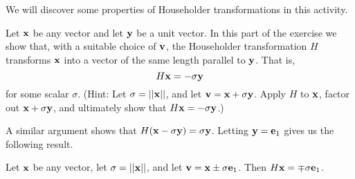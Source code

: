 \begin{pactivity} We will discover some properties of Householder transformations in this activity.
\ba
\item Let $\mathbf{x}$ be any vector and let $\mathbf{y}$ be a unit vector. In this part of the exercise we show that, with a suitable choice of $\mathbf{v}$, the Householder transformation $H$ transforms $\mathbf{x}$ into a vector of the same length parallel to $\mathbf{y}$. That is, 
\[H \mathbf{x} = -\sigma \mathbf{y}\]
for some scalar $\sigma$. (Hint: Let $\sigma = ||\mathbf{x}||$, and let $\mathbf{v} = \mathbf{x} + \sigma \mathbf{y}$. Apply $H$ to $\mathbf{x}$, factor out $\mathbf{x} + \sigma \mathbf{y}$, and ultimately show that $H \mathbf{x} = -\sigma \mathbf{y}$.)

\begin{comment}
 
\solution Applying $H$ to $\vx$ gives us 
\begin{align*}
H \vx &= \left(I - \frac{2\vv \vv^{\tr}}{||\vv||^2} \right) \vx \\
	&= \vx - \frac{2}{||\vv||^2} \vv \vv^{\tr} \vx \\
	&= \vx - (\vx + \sigma \vy) \frac{2(\vx + \sigma \vy)^{\tr} \vx}{(\vx + \sigma \vy)^{\tr} (\vx + \sigma \vy)}   \\
	&= \vx - (\vx + \sigma \vy) \frac{2(\vx^{\tr}\vx + \sigma \vy^{\tr} \vx)}{(\vx^{\tr}\vx + \sigma \vy^{\tr} \vx + \sigma \vx^{\tr} \vy + \sigma^2 \vy^{\tr} \vy)}   \\
	&= \vx - (\vx + \sigma \vy) \frac{2(||\vx||^2 + \sigma \vy^{\tr} \vx)}{\sigma^2 + \sigma \vy^{\tr} \vx + \sigma \vy^{\tr} \vx + \sigma^2 ||\vy||^2}   \\
	&= \vx - (\vx + \sigma \vy) \frac{2(\sigma^2 + \sigma \vy^{\tr} \vx)}{2(\sigma^2 + \sigma \vy^{\tr} \vx)}   \\
	&= \vx - (\vx + \sigma \vy) \\
	&= -\sigma \vy.
\end{align*}

\end{comment}

A similar argument shows that $H (\mathbf{x} - \sigma \mathbf{y}) = \sigma \mathbf{y}$. Letting $\mathbf{y} = \mathbf{e}_1$ gives us the following result. 

\begin{lemma} \label{lem:Householder}  Let $\mathbf{x}$ be any vector, let $\sigma = ||\mathbf{x}||$, and let $\mathbf{v} = \mathbf{x} \pm \sigma \mathbf{e}_1$. Then $H \mathbf{x} = \mp \sigma \mathbf{e}_1$. 
\end{lemma}


\end{pactivity}
